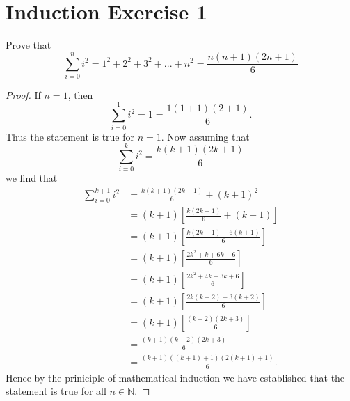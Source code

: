 \documentclass{article}
\begin{document}
\section*{Induction Exercise 1}
Prove that
\[
	\sum_{i=0}^{n} i^2 = 1^2 + 2^2 + 3^2 + ... + n^2 = \frac{n(n+1)(2n+1)}{6}
\]
\begin{proof}
	If $n=1$, then
	\[
		\sum_{i=0}^{1} i^2 = 1 = \frac{1(1+1)(2+1)}{6}.
	\]
	Thus the statement is true for $n=1$.
	\newline\newline
	Now assuming that
	\[
		\sum_{i=0}^{k} i^2 = \frac{k(k+1)(2k+1)}{6}
	\]
	we find that 
	\begin{align*}
		\sum_{i=0}^{k+1} i^2 & = \frac{k(k+1)(2k+1)}{6} + (k+1)^2 \\
				     & = (k+1) \left[ \frac{k(2k+1)}{6} + (k+1) \right] \\
				     & = (k+1) \left[ \frac{k(2k+1) + 6(k+1)}{6} \right] \\
				     & = (k+1) \left[ \frac{2k^2 + k + 6k + 6}{6} \right] \\
				     & = (k+1) \left[ \frac{2k^2 + 4k + 3k + 6}{6} \right] \\
				     & = (k+1) \left[ \frac{2k(k+2) + 3(k+2)}{6} \right] \\
				     & = (k+1) \left[ \frac{(k+2)(2k+3)}{6} \right] \\
				     & = \frac{(k+1)(k+2)(2k+3)}{6} \\
				     & = \frac{(k+1)((k+1)+1)(2(k+1)+1)}{6}.
	\end{align*}
	Hence by the priniciple of mathematical induction we have established that the statement is true for all $n \in \mathbb{N}$.
\end{proof}
\end{document}
